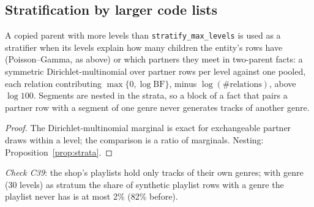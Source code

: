 \subsection{Stratification by larger code lists}
\begin{proposition}\label{prop:partner}
A copied parent with more levels than \texttt{stratify\_max\_levels} is used as a stratifier when its levels explain how many children the entity's rows have (Poisson--Gamma, as above) or which partners they meet in two-parent facts: a symmetric Dirichlet-multinomial over partner rows per level against one pooled, each relation contributing $\max\{0,\log\mathrm{BF}\}$, minus $\log(\#\text{relations})$, above $\log100$. Segments are nested in the strata, so a block of a fact that pairs a partner row with a segment of one genre never generates tracks of another genre.
\end{proposition}
\begin{proof}
The Dirichlet-multinomial marginal is exact for exchangeable partner draws within a level; the comparison is a ratio of marginals. Nesting: Proposition~\ref{prop:strata}.
\end{proof}
\noindent\emph{Check C39}: the shop's playlists hold only tracks of their own genres; with genre (30 levels) as stratum the share of synthetic playlist rows with a genre the playlist never has is at most 2\% (82\% before).

